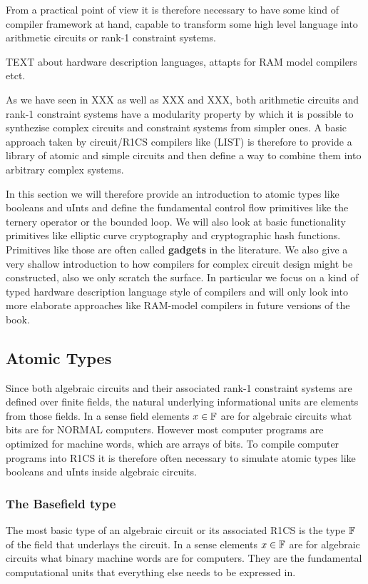 From a practical point of view it is therefore necessary to have some kind of compiler framework at hand, capable to transform some high level language into arithmetic circuits or rank-1 constraint systems. 

TEXT about hardware description languages, attapts for RAM model compilers etct.

As we have seen in XXX as well as XXX and XXX, both arithmetic circuits and rank-1 constraint systems have a modularity property by which it is possible to synthezise  complex circuits and constraint systems from simpler ones. A basic approach taken by circuit/R1CS compilers like (LIST) is therefore to provide a library of atomic and simple circuits and then define a way to combine them into arbitrary complex systems. 

In this section we will therefore provide an introduction to atomic types like booleans and uInts and define the fundamental control flow primitives like the ternery operator or the bounded loop. We will also look at basic functionality primitives like elliptic curve cryptography and cryptographic hash functions. Primitives like those are often called \textbf{gadgets} in the literature. We also give a very shallow introduction to how compilers for complex circuit design might be constructed, also we only scratch the surface. In particular we focus on a kind of typed hardware description language style of compilers and will only look into more elaborate approaches like RAM-model compilers in future versions of the book.
\subsection{Atomic Types} 
Since both algebraic circuits and their associated rank-1 constraint systems are defined over finite fields, the natural underlying informational units are elements from those fields. In a sense field elements $x\in \mathbb{F}$ are for algebraic circuits what bits are for NORMAL computers. However most computer programs are optimized for machine words, which are arrays of bits. To compile computer programs into R1CS it is therefore often necessary to simulate atomic types like booleans and uInts inside algebraic circuits.
\subsubsection{The Basefield type} The most basic type of an algebraic circuit or its associated R1CS is the type $\mathbb{F}$ of the field that underlays the circuit. In a sense elements $x\in\mathbb{F}$ are for algebraic circuits what binary machine words are for computers. They are the fundamental computational units that everything else needs to be expressed in. 

